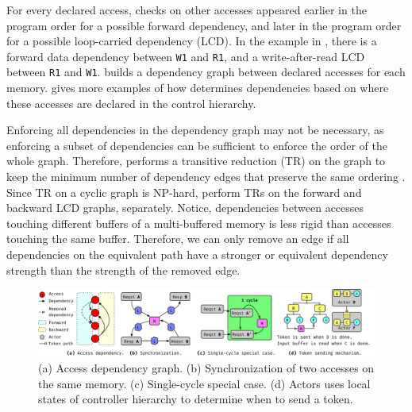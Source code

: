 For every declared access, \name{} checks on other accesses appeared earlier in the program order
for a possible forward dependency, and later in the program order for a possible loop-carried dependency (LCD). 
In the example in , there is a forward data dependency between \texttt{W1} and
\texttt{R1}, and a write-after-read LCD between \texttt{R1} and \texttt{W1}. 
\name builds a dependency graph between declared accesses for each memory.
 gives more examples of how \name
determines dependencies based on where these accesses are declared in the control hierarchy.

Enforcing all dependencies in the dependency graph may not be necessary, as enforcing a subset of
dependencies can be sufficient to enforce the order of the whole graph.
Therefore, \name performs a transitive reduction (TR) on the graph to keep the minimum number of dependency edges that preserve the same ordering \cite{tr}.
Since TR on a cyclic graph is NP-hard, \name perform TRs on the forward and backward LCD graphs, separately.
Notice, dependencies between accesses touching different buffers of a multi-buffered memory is less rigid than accesses touching the same buffer.
Therefore, we can only remove an edge if all dependencies on the equivalent path have a stronger or equivalent dependency strength than the strength of the removed edge.


\begin{figure}
\centering
\includegraphics[width=1.0\textwidth]{figs/synch_mech.pdf}
\caption{
    (a) Access dependency graph.
    (b) Synchronization of two accesses on the same memory.
    (c) Single-cycle special case.
    (d) Actors uses local states of controller hierarchy to determine when to send a token.
}\label{fig:depgraph}\label{fig:token}\label{fig:tokentrick}\label{fig:tokenwhen}
\end{figure}

